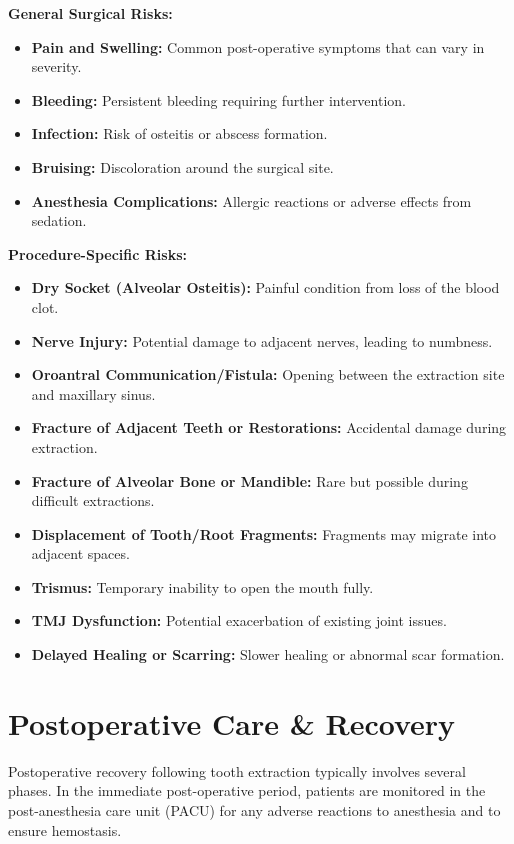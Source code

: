 \textbf{General Surgical Risks:}

\begin{itemize}
  \item \textbf{Pain and Swelling:} Common post-operative symptoms that can vary in severity.
  \item \textbf{Bleeding:} Persistent bleeding requiring further intervention.
  \item \textbf{Infection:} Risk of osteitis or abscess formation.
  \item \textbf{Bruising:} Discoloration around the surgical site.
  \item \textbf{Anesthesia Complications:} Allergic reactions or adverse effects from sedation.
\end{itemize}

\textbf{Procedure-Specific Risks:}

\begin{itemize}
  \item \textbf{Dry Socket (Alveolar Osteitis):} Painful condition from loss of the blood clot.
  \item \textbf{Nerve Injury:} Potential damage to adjacent nerves, leading to numbness.
  \item \textbf{Oroantral Communication/Fistula:} Opening between the extraction site and maxillary sinus.
  \item \textbf{Fracture of Adjacent Teeth or Restorations:} Accidental damage during extraction.
  \item \textbf{Fracture of Alveolar Bone or Mandible:} Rare but possible during difficult extractions.
  \item \textbf{Displacement of Tooth/Root Fragments:} Fragments may migrate into adjacent spaces.
  \item \textbf{Trismus:} Temporary inability to open the mouth fully.
  \item \textbf{TMJ Dysfunction:} Potential exacerbation of existing joint issues.
  \item \textbf{Delayed Healing or Scarring:} Slower healing or abnormal scar formation.
\end{itemize}

\section*{Postoperative Care \& Recovery}
Postoperative recovery following tooth extraction typically involves several phases. In the immediate post-operative period, patients are monitored in the post-anesthesia care unit (PACU) for any adverse reactions to anesthesia and to ensure hemostasis. 

